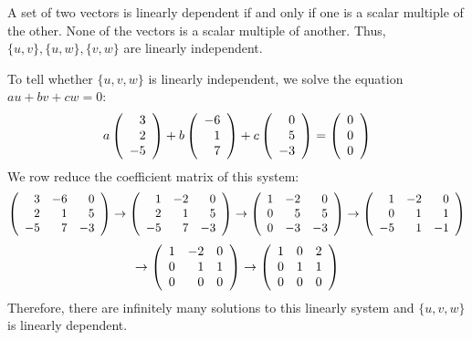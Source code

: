\documentclass{ximera}
\begin{document}
\begin{exercise}
\begin{solution}
\begin{enumeratea}
\item A set of two vectors is linearly dependent if and only if one is a scalar multiple of the other.  None of the vectors is a scalar multiple of another. Thus, $\{u,v\}, \{u,w\}, \{v,w\}$ are linearly independent.
\item To tell whether $\{u,v,w\}$ is linearly independent, we solve the equation $au + bv + cw = 0$:
\[ 
a \left(\begin{array}{rrrrrrrrrrrrrrrrrr} 3 \\ 2 \\ -5 \end{array}\right) + b\left(\begin{array}{rrrrrrrrrrrrrrrrrr} -6\\1\\7 \end{array}\right) + c\left(\begin{array}{rrrrrrrrrrrrrrrrrr} 0\\5\\-3 \end{array}\right) = \left(\begin{array}{rrrrrrrrrrrrrrrrrr} 0\\0\\0 \end{array}\right)
\]
We row reduce the coefficient matrix of this system: 
\[ 
\left(\begin{array}{rrrrrrrrrrrrrrrrrr}  3 & -6 & 0 \\ 2 & 1 & 5 \\ -5 & 7 & -3  \end{array}\right) \to \left(\begin{array}{rrrrrrrrrrrrrrrrrr}  1 & -2 & 0 \\ 2 & 1 & 5 \\ -5 & 7 & -3  \end{array}\right)  \to \left(\begin{array}{rrrrrrrrrrrrrrrrrr}  1 & -2 & 0 \\ 0 & 5 & 5 \\ 0 & -3 & -3  \end{array}\right) \to\left(\begin{array}{rrrrrrrrrrrrrrrrrr}  1 & -2 & 0 \\ 0 & 1 & 1 \\ -5 & 1 & -1  \end{array}\right) \] \[ \to \left(\begin{array}{rrrrrrrrrrrrrrrrrr}  1 & -2 & 0 \\ 0 & 1 & 1 \\ 0 & 0 & 0  \end{array}\right) \to  \left(\begin{array}{rrrrrrrrrrrrrrrrrr}  1 & 0 & 2 \\ 0 & 1 & 1 \\ 0 & 0 & 0  \end{array}\right) 
\]
Therefore, there are infinitely many solutions to this linearly system and $\{u,v,w\}$ is linearly dependent.

\end{enumeratea}



\end{solution}
\end{exercise}


\end{document}
